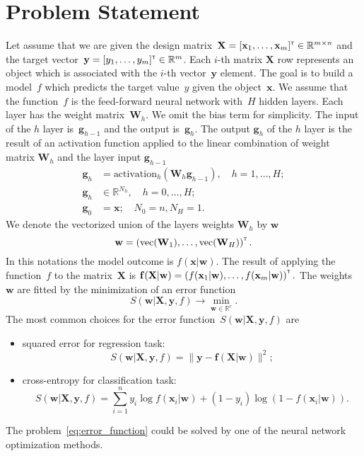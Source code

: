 \documentclass[a4paper,12pt]{article}
\theoremstyle{plain} %
\theoremstyle{definition} %
\theoremstyle{remark} %
\newcommand{\bw}{\mathbf{w}}
\newcommand{\by}{\mathbf{y}}
\newcommand{\bx}{\mathbf{x}}
\newcommand{\bX}{\mathbf{X}}
\newcommand{\bbR}{\mathbb{R}}
\newcommand{\T}{{\text{\tiny\sffamily\upshape\mdseries T}}}
\begin{document}
		
	\section*{Problem Statement}
	Let assume that we are given the design matrix~$\bX = [\bx_1, \dots, \bx_m]^{\T} \in \bbR^{m \times n}$ and the target vector~$\by = [y_1, \dots, y_m]^{\T} \in \bbR^{m}$. 
	Each $i$-th matrix $\bX$ row represents an  object which is associated with the $i$-th vector~$\by$ element. 
	The goal is to build a model~$f$ which predicts the target value~$y$ given the object~$\bx$. 
	We assume that the function~$f$ is the feed-forward neural network with~$H$ hidden layers. 
	Each layer has the weight matrix~$\mathbf{W}_h$. We omit the bias term for simplicity. 
	The input of the $h$ layer is~$\mathbf{g}_{h-1}$ and the output is~$\mathbf{g}_h$. 
	The output $\mathbf{g}_h$ of the $h$ layer is the result of an activation function applied to the linear combination of weight matrix $\mathbf{W}_h$ and the layer input $\mathbf{g}_{h-1}$
	\begin{align*}
		\mathbf{g}_{h} &= \text{activation}_h(\mathbf{W}_h \mathbf{g}_{h-1}), \quad h=1,\dots, H;\\
		\mathbf{g}_h &\in \bbR^{N_h}, \quad h = 0, \dots, H; \\
		\mathbf{g}_0 &= \bx; \quad N_0 = n, N_H = 1.
	\end{align*}
	We denote the vectorized union of the layers weights $\mathbf{W}_h$ by $\bw$
	\begin{equation}
		\bw = \left( \text{vec}(\mathbf{W}_1), \dots, \text{vec}(\mathbf{W}_H) \right)^{\T}.
	\end{equation}
	In this notations the model outcome is $f(\bx | \bw)$.
	The result of applying the function~$f$ to the matrix~$\bX$ is
	$\mathbf{f}(\bX | \bw) = \left(f(\bx_1 | \bw), \dots, f(\bx_m | \bw)\right)^{\T}.$
	The weights~$\bw$ are fitted by the minimization of an error function
	\begin{equation}
	S(\bw | \bX, \by, f)  \rightarrow \min_{\bw \in \bbR^r}.
	\label{eq:error_function}
	\end{equation}
	The most common choices for the error function~$S(\bw | \bX, \by, f)$ are
	\begin{itemize}
		\item squared error for regression task: 
		$$
			S(\bw | \bX, \by, f) = \| \by - \mathbf{f} (\bX | \bw)\|^2;
		$$
		\item cross-entropy for classification task: 
		$$
			S(\bw | \bX, \by, f) = \sum_{i=1}^n y_i \log f (\bx_i | \bw) + (1 - y_i) \log (1 - f (\bx_i | \bw)).
		$$
	\end{itemize}
	The problem~\ref{eq:error_function} could be solved by one of the neural network optimization methods.
	
\end{document}
